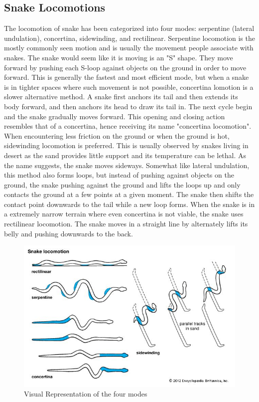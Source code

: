 \documentclass[twoside]{article}
\begin{document}
\subsection{Snake Locomotions}
The locomotion of snake has been categorized into four modes: serpentine (lateral undulation), concertina, sidewinding, and rectilinear. Serpentine locomotion is the mostly commonly seen motion and is usually the movement people associate with snakes. The snake would seem like it is moving is an "S" shape. They move forward by pushing each S-loop against objects on the ground in order to move forward. This is generally the fastest and most efficient mode, but when a snake is in tighter spaces where such movement is not possible, concertina lomotion is a slower alternative method. A snake first anchors its tail and then extends its body forward, and then anchors its head to draw its tail in. The next cycle begin and the snake gradually moves forward. This opening and closing action resembles that of a concertina, hence receiving its name "concertina locomotion". When encountering less friction on the ground or when the ground is hot, sidewinding locomotion is preferred. This is usually observed by snakes living in desert as the sand provides little support and its temperature can be lethal. As the name suggests, the snake moves sideways. Somewhat like lateral undulation, this method also forms loops, but instead of pushing against objects on the ground, the snake pushing against the ground and lifts the loops up and only contacts the ground at a few points at a given moment. The snake then shifts the contact point downwards to the tail while a new loop forms. When the snake is in a extremely narrow terrain where even concertina is not viable, the snake uses rectilinear locomotion. The snake moves in a straight line by alternately lifts its belly and pushing downwards to the back. 


\begin{figure}[H]
\centering
\includegraphics[width=0.75\linewidth]{snake-motion}
\caption{Visual Representation of the four modes}
\end{figure}
\end{document}
